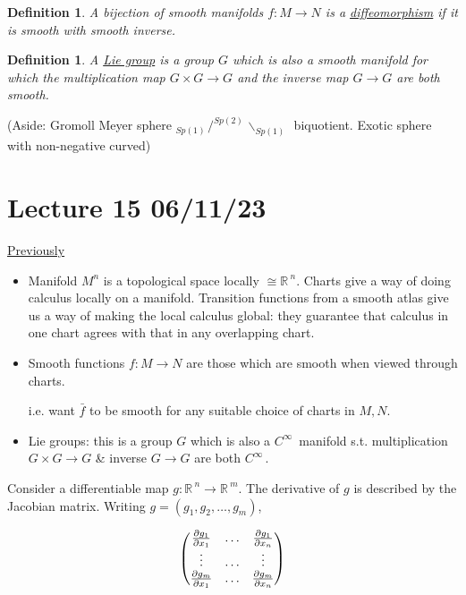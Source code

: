 \documentclass[12pt,a4paper]{article}
\newcommand{\rR}{\ensuremath{\mathbb{R}\,}}
\newcommand{\cinf}{\ensuremath{C^{\infty}\,}}
\newcommand{\gspk}[1]{\ensuremath{Sp(#1)\,}}
\newcommand{\ul}[1]{\underline{#1}}
\newtheorem{defn}[thm]{Definition}
\begin{document}
\begin{defn}
A bijection of smooth manifolds $f:M\to N$ is a \ul{diffeomorphism} if it is smooth with smooth inverse.
\end{defn}

\begin{defn}
A \ul{Lie group} is a group $G$ which is also a smooth manifold for which the multiplication map $G\times G\to G$ and the inverse map $G\to G$ are both smooth.
\end{defn}
 
(Aside: Gromoll Meyer sphere $_{\gspk{1}}\slash ^{\gspk{2}} \backslash _{\gspk{1}}$ biquotient. Exotic sphere with non-negative curved)
 
\section{Lecture 15 06/11/23}

\ul{Previously}

\begin{itemize}
\item Manifold $M^n$ is a topological space locally $\cong \rR^n$. Charts give a way of doing calculus locally on a manifold. Transition functions from a smooth atlas give us a way of making the local calculus global: they guarantee that calculus in one chart agrees with that in any overlapping chart.
\item Smooth functions $f:M \to N$ are those which are smooth when viewed through charts.

\begin{center}
\end{center}
i.e. want $\bar{f}$ to be smooth for any suitable choice of charts in $M,N$.
\item Lie groups: this is a group $G$ which is also a $\cinf$ manifold s.t. multiplication $G\times G\to G$ \& inverse $G\to G$ are both \cinf.
\end{itemize} 

Consider a differentiable map $g:\rR^n\to \rR^m$. The derivative of $g$ is described by the Jacobian  matrix. Writing $g=(g_1,g_2,\ldots, g_m)$,

\[\pmqty{\pdv{g_1}{x_1} & \ldots & \pdv{g_1}{x_n}\\ 
\vdots & \ldots & \vdots \\ 
\pdv{g_m}{x_1} & \ldots & \pdv{g_m}{x_n} }\]
\end{document}
